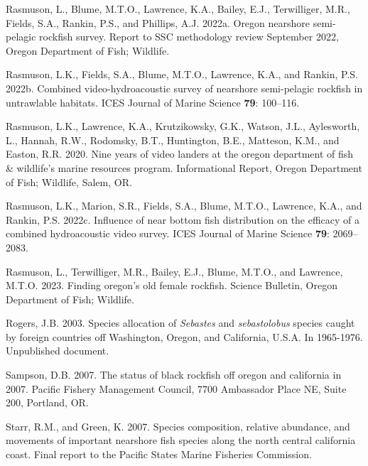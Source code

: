 \documentclass[11pt,
  letterpaper,
]{article}
\newlength{\cslhangindent}
\newenvironment{CSLReferences}[2] %
 {%
  \setlength{\parindent}{0pt}
  \ifodd #1 \everypar{\setlength{\hangindent}{\cslhangindent}}\ignorespaces\fi
  \ifnum #2 > 0
  \setlength{\parskip}{#2\baselineskip}
  \fi
 }%
 {}
\begin{document}
\begin{CSLReferences}{1}{0}
\leavevmode{}%
Rasmuson, L., Blume, M.T.O., Lawrence, K.A., Bailey, E.J., Terwilliger, M.R., Fields, S.A., Rankin, P.S., and Phillips, A.J. 2022a. Oregon nearshore semi-pelagic rockfish survey. Report to SSC methodology review September 2022, Oregon Department of Fish; Wildlife.

\leavevmode{}%
Rasmuson, L.K., Fields, S.A., Blume, M.T.O., Lawrence, K.A., and Rankin, P.S. 2022b. Combined video-hydroacoustic survey of nearshore semi-pelagic rockfish in untrawlable habitats. {ICES} Journal of Marine Science \textbf{79}: 100--116.

\leavevmode{}%
Rasmuson, L.K., Lawrence, K.A., Krutzikowsky, G.K., Watson, J.L., Aylesworth, L., Hannah, R.W., Rodomsky, B.T., Huntington, B.E., Matteson, K.M., and Easton, R.R. 2020. Nine years of video landers at the oregon department of fish \& wildlife's marine resources program. Informational Report, Oregon Department of Fish; Wildlife, Salem, {OR}.

\leavevmode{}%
Rasmuson, L.K., Marion, S.R., Fields, S.A., Blume, M.T.O., Lawrence, K.A., and Rankin, P.S. 2022c. Influence of near bottom fish distribution on the efficacy of a combined hydroacoustic video survey. {ICES} Journal of Marine Science \textbf{79}: 2069--2083.

\leavevmode{}%
Rasmuson, L., Terwilliger, M.R., Bailey, E.J., Blume, M.T.O., and Lawrence, M.T.O. 2023. Finding oregon's old female rockfish. Science Bulletin, Oregon Department of Fish; Wildlife.

\leavevmode{}%
Rogers, J.B. 2003. Species allocation of \emph{{Sebastes}} and \emph{sebastolobus} species caught by foreign countries off {Washington}, {Oregon}, and {California}, {U}.{S}.{A}. In 1965-1976. Unpublished document.

\leavevmode{}%
Sampson, D.B. 2007. The status of black rockfish off oregon and california in 2007. Pacific Fishery Management Council, 7700 Ambassador Place NE, Suite 200, Portland, OR.

\leavevmode{}%
Starr, R.M., and Green, K. 2007. Species composition, relative abundance, and movements of important nearshore fish species along the north central california coast. Final report to the Pacific States Marine Fisheries Commission.


\end{CSLReferences}
\end{document}
